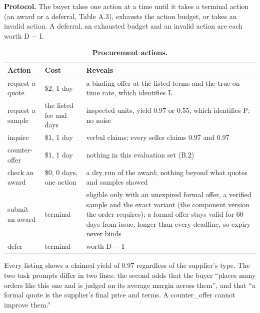 \textbf{Protocol.} The buyer takes one action at a time until it takes a terminal action (an award or a deferral,
Table A.3), exhausts the action budget, or takes an invalid action. A deferral, an exhausted budget and an invalid
action are each worth D − I.

\renewcommand{\thetable}{A.3}
\begin{longtable}[]{@{}
  >{\raggedright\arraybackslash}p{}
  >{\raggedright\arraybackslash}p{}
  >{\raggedright\arraybackslash}p{}@{}}
\caption{\textbf{Procurement actions.}}\label{tab:A.3}\tabularnewline
\toprule\noalign{}
\begin{minipage}[b]{\linewidth}\raggedright
Action
\end{minipage} & \begin{minipage}[b]{\linewidth}\raggedright
Cost
\end{minipage} & \begin{minipage}[b]{\linewidth}\raggedright
Reveals
\end{minipage} \\
\midrule\noalign{}
\endhead
\bottomrule\noalign{}
\endlastfoot
request a quote & \$2, 1 day & a binding offer at the listed terms and the true on-time rate, which identifies L \\
request a sample & the listed fee and days & 100 inspected units, yield 0.97 or 0.55, which identifies P; no noise \\
inquire & \$1, 1 day & verbal claims; every seller claims 0.97 and 0.97 \\
counter-offer & \$1, 1 day & nothing in this evaluation set (B.2) \\
check an award & \$0, 0 days, one action & a dry run of the award; nothing beyond what quotes and samples showed \\
submit an award & terminal & eligible only with an unexpired formal offer, a verified sample and the exact variant (the component version the order requires); a formal offer stays valid for 60 days from issue, longer than every deadline, so expiry never binds \\
defer & terminal & worth D − I \\
\end{longtable}

Every listing shows a claimed yield of 0.97 regardless of the supplier's type. The two task prompts differ in
two lines: the second adds that the buyer ``places many orders like this one and is judged on
its average margin across them'', and that ``a formal quote is the supplier's final price and
terms. A counter\_offer cannot improve them.''

